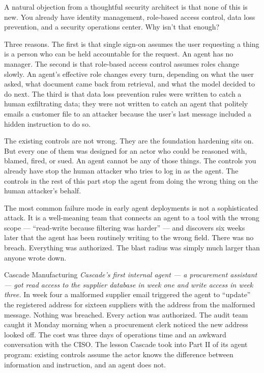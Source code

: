 A natural objection from a thoughtful security architect is that none of this is new. You already have identity management, role-based access control, data loss prevention, and a security operations center. Why isn't that enough?

Three reasons. The first is that single sign-on assumes the user requesting a thing is a person who can be held accountable for the request. An agent has no manager. The second is that role-based access control assumes roles change slowly. An agent's effective role changes every turn, depending on what the user asked, what document came back from retrieval, and what the model decided to do next. The third is that data loss prevention rules were written to catch a human exfiltrating data; they were not written to catch an agent that politely emails a customer file to an attacker because the user's last message included a hidden instruction to do so.

The existing controls are not wrong. They are the foundation hardening sits on. But every one of them was designed for an actor who could be reasoned with, blamed, fired, or sued. An agent cannot be any of those things. The controls you already have stop the human attacker who tries to log in as the agent. The controls in the rest of this part stop the agent from doing the wrong thing on the human attacker's behalf.

\begin{TNwarning}
The most common failure mode in early agent deployments is not a sophisticated attack. It is a well-meaning team that connects an agent to a tool with the wrong scope --- ``read-write because filtering was harder'' --- and discovers six weeks later that the agent has been routinely writing to the wrong field. There was no breach. Everything was authorized. The blast radius was simply much larger than anyone wrote down.
\end{TNwarning}

\begin{TNinpractice}{Cascade Manufacturing}
\textit{Cascade's first internal agent --- a procurement assistant --- got read access to the supplier database in week one and write access in week three.} In week four a malformed supplier email triggered the agent to ``update'' the registered address for sixteen suppliers with the address from the malformed message. Nothing was breached. Every action was authorized. The audit team caught it Monday morning when a procurement clerk noticed the new address looked off. The cost was three days of operations time and an awkward conversation with the CISO. The lesson Cascade took into Part II of its agent program: existing controls assume the actor knows the difference between information and instruction, and an agent does not.
\end{TNinpractice}

